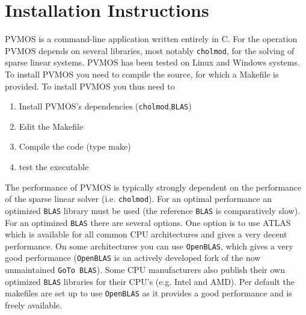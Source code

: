 \documentclass[noshowpacs,preprintnumbers,amsmath,amssymb, letter]{revtex4}
\begin{document}
\section{Installation Instructions}	
PVMOS is a command-line application written entirely in C. For the operation PVMOS depends on several libraries, most notably \texttt{cholmod}, for the solving of sparse linear systems. PVMOS has been tested on Linux and Windows systems. To install PVMOS you need to compile the source, for which a Makefile is provided. To install PVMOS you thus need to
\begin{enumerate}
\item{} Install PVMOS's dependencies (\texttt{cholmod},\texttt{BLAS})
\item{} Edit the Makefile
\item{} Compile the code (type make)
\item{} test the executable
\end{enumerate}

The performance of PVMOS is typically strongly dependent on the performance of the sparse linear solver (i.e. \texttt{cholmod}). For an optimal performance an optimized \texttt{BLAS} library must be used (the reference \texttt{BLAS} is comparatively slow). For an optimized \texttt{BLAS} there are several options. One option is to use ATLAS which is available for all common CPU architectures and gives a very decent performance. On some architectures you can use \texttt{OpenBLAS}, which gives a very good performance (\texttt{OpenBLAS} is an actively developed fork of the now unmaintained \texttt{GoTo BLAS}). Some CPU manufacturers also publish their own optimized \texttt{BLAS} libraries for their CPU's (e.g. Intel and AMD). Per default the makefiles are set up to use \texttt{OpenBLAS} as it provides a good performance and is freely available.
\end{document}
